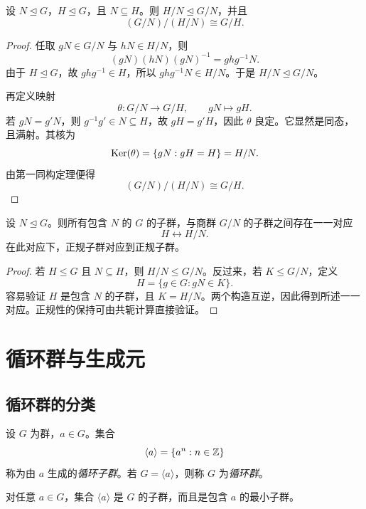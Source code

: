 \begin{theorem}[第三同构定理]
设 $N\trianglelefteq G$，$H\trianglelefteq G$，且 $N\subseteq H$。则 $H/N\trianglelefteq G/N$，并且
\[
 (G/N)/(H/N) \cong G/H.
\]
\end{theorem}

\begin{proof}
任取 $gN\in G/N$ 与 $hN\in H/N$，则
\[
 (gN)(hN)(gN)^{-1}=ghg^{-1}N.
\]
由于 $H\trianglelefteq G$，故 $ghg^{-1}\in H$，所以 $ghg^{-1}N\in H/N$。于是 $H/N\trianglelefteq G/N$。

再定义映射
\[
 \theta:G/N \longrightarrow G/H, \qquad gN \longmapsto gH.
\]
若 $gN=g'N$，则 $g^{-1}g'\in N\subseteq H$，故 $gH=g'H$，因此 $\theta$ 良定。它显然是同态，且满射。其核为
\[
 \mathrm{Ker}(\theta)=\{gN:gH=H\}=H/N.
\]
由第一同构定理便得
\[
 (G/N)/(H/N) \cong G/H.
\]
\end{proof}

\begin{corollary}[对应定理]
设 $N\trianglelefteq G$。则所有包含 $N$ 的 $G$ 的子群，与商群 $G/N$ 的子群之间存在一一对应
\[
 H \longleftrightarrow H/N.
\]
在此对应下，正规子群对应到正规子群。
\end{corollary}

\begin{proof}
若 $H\le G$ 且 $N\subseteq H$，则 $H/N\le G/N$。反过来，若 $K\le G/N$，定义
\[
 H=\{g\in G:gN\in K\}.
\]
容易验证 $H$ 是包含 $N$ 的子群，且 $K=H/N$。两个构造互逆，因此得到所述一一对应。正规性的保持可由共轭计算直接验证。
\end{proof}

\section{循环群与生成元}

\subsection*{循环群的分类}

\begin{definition}
设 $G$ 为群，$a\in G$。集合
\[
 \langle a \rangle=\{a^n:n\in \mathbb{Z}\}
\]
称为由 $a$ 生成的\emph{循环子群}。若 $G=\langle a \rangle$，则称 $G$ 为\emph{循环群}。
\end{definition}

\begin{proposition}
对任意 $a\in G$，集合 $\langle a \rangle$ 是 $G$ 的子群，而且是包含 $a$ 的最小子群。
\end{proposition}

